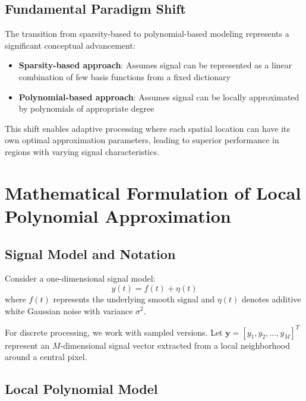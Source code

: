 \documentclass[12pt]{article}
\renewcommand{\vec}[1]{\mathbf{#1}}
\theoremstyle{definition}
\begin{document}
\subsection{Fundamental Paradigm Shift}
\label{subsec:paradigm}

The transition from sparsity-based to polynomial-based modeling represents a significant conceptual advancement:

\begin{itemize}
    \item \textbf{Sparsity-based approach}: Assumes signal can be represented as a linear combination of few basis functions from a fixed dictionary
    \item \textbf{Polynomial-based approach}: Assumes signal can be locally approximated by polynomials of appropriate degree
\end{itemize}

This shift enables adaptive processing where each spatial location can have its own optimal approximation parameters, leading to superior performance in regions with varying signal characteristics.

\newpage

\section{Mathematical Formulation of Local Polynomial Approximation}
\label{sec:math_formulation}

\subsection{Signal Model and Notation}
\label{subsec:signal_model}

Consider a one-dimensional signal model:
\begin{equation}
    \label{eq:signal_model}
    y(t) = f(t) + \eta(t)
\end{equation}
where $f(t)$ represents the underlying smooth signal and $\eta(t)$ denotes additive white Gaussian noise with variance $\sigma^2$.

For discrete processing, we work with sampled versions. Let $\vec{y} = [y_1, y_2, \ldots, y_M]^T$ represent an $M$-dimensional signal vector extracted from a local neighborhood around a central pixel.

\subsection{Local Polynomial Model}
\label{subsec:poly_model}
\end{document}
